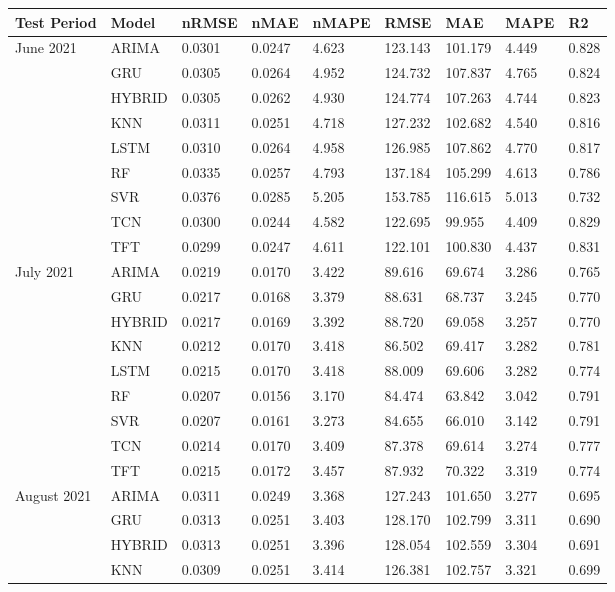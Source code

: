 \begin{tabular}{lllllllll}
\toprule
Test Period & Model & nRMSE & nMAE & nMAPE & RMSE & MAE & MAPE & R2 \\
\midrule
June 2021 & ARIMA & 0.0301 & 0.0247 & 4.623 & 123.143 & 101.179 & 4.449 & 0.828 \\
 & GRU & 0.0305 & 0.0264 & 4.952 & 124.732 & 107.837 & 4.765 & 0.824 \\
 & HYBRID & 0.0305 & 0.0262 & 4.930 & 124.774 & 107.263 & 4.744 & 0.823 \\
 & KNN & 0.0311 & 0.0251 & 4.718 & 127.232 & 102.682 & 4.540 & 0.816 \\
 & LSTM & 0.0310 & 0.0264 & 4.958 & 126.985 & 107.862 & 4.770 & 0.817 \\
 & RF & 0.0335 & 0.0257 & 4.793 & 137.184 & 105.299 & 4.613 & 0.786 \\
 & SVR & 0.0376 & 0.0285 & 5.205 & 153.785 & 116.615 & 5.013 & 0.732 \\
 & TCN & 0.0300 & 0.0244 & 4.582 & 122.695 & 99.955 & 4.409 & 0.829 \\
 & TFT & 0.0299 & 0.0247 & 4.611 & 122.101 & 100.830 & 4.437 & 0.831 \\
July 2021 & ARIMA & 0.0219 & 0.0170 & 3.422 & 89.616 & 69.674 & 3.286 & 0.765 \\
 & GRU & 0.0217 & 0.0168 & 3.379 & 88.631 & 68.737 & 3.245 & 0.770 \\
 & HYBRID & 0.0217 & 0.0169 & 3.392 & 88.720 & 69.058 & 3.257 & 0.770 \\
 & KNN & 0.0212 & 0.0170 & 3.418 & 86.502 & 69.417 & 3.282 & 0.781 \\
 & LSTM & 0.0215 & 0.0170 & 3.418 & 88.009 & 69.606 & 3.282 & 0.774 \\
 & RF & 0.0207 & 0.0156 & 3.170 & 84.474 & 63.842 & 3.042 & 0.791 \\
 & SVR & 0.0207 & 0.0161 & 3.273 & 84.655 & 66.010 & 3.142 & 0.791 \\
 & TCN & 0.0214 & 0.0170 & 3.409 & 87.378 & 69.614 & 3.274 & 0.777 \\
 & TFT & 0.0215 & 0.0172 & 3.457 & 87.932 & 70.322 & 3.319 & 0.774 \\
August 2021 & ARIMA & 0.0311 & 0.0249 & 3.368 & 127.243 & 101.650 & 3.277 & 0.695 \\
 & GRU & 0.0313 & 0.0251 & 3.403 & 128.170 & 102.799 & 3.311 & 0.690 \\
 & HYBRID & 0.0313 & 0.0251 & 3.396 & 128.054 & 102.559 & 3.304 & 0.691 \\
 & KNN & 0.0309 & 0.0251 & 3.414 & 126.381 & 102.757 & 3.321 & 0.699 \\

\end{tabular}
